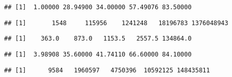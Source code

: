 \documentclass[]{article}
\newenvironment{Shaded}{\begin{snugshade}}{\end{snugshade}}
\newcommand{\KeywordTok}[1]{\textcolor[rgb]{0.13,0.29,0.53}{\textbf{#1}}}
\newcommand{\StringTok}[1]{\textcolor[rgb]{0.31,0.60,0.02}{#1}}
\newcommand{\OperatorTok}[1]{\textcolor[rgb]{0.81,0.36,0.00}{\textbf{#1}}}
\newcommand{\NormalTok}[1]{#1}
\begin{document}
\begin{verbatim}
## [1]  1.00000 28.94900 34.00000 57.49076 83.50000
\end{verbatim}

\begin{Shaded}
\end{Shaded}

\begin{verbatim}
## [1]       1548     115956    1241248   18196783 1376048943
\end{verbatim}

\begin{Shaded}
\end{Shaded}

\begin{verbatim}
## [1]    363.0    873.0   1153.5   2557.5 134864.0
\end{verbatim}

\begin{Shaded}
\end{Shaded}

\begin{verbatim}
## [1]  3.98908 35.60000 41.74110 66.60000 84.10000
\end{verbatim}

\begin{Shaded}
\end{Shaded}

\begin{verbatim}
## [1]      9584   1960597   4750396  10592125 148435811
\end{verbatim}
\end{document}
